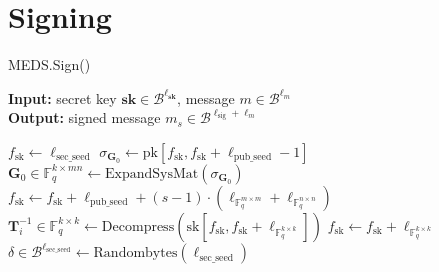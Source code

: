 \section{Signing}
\begin{algorithm}[H]
\caption{MEDS.Sign()}\label{alg:medssign}
\hspace*{\algorithmicindent} \textbf{Input:} secret key $\textbf{sk} \in \mathcal{B}^{\ell_\textbf{sk}}$, message $m \in \mathcal{B}^{\ell_m}$\\
\hspace*{\algorithmicindent} \textbf{Output:} signed message $m_s \in \mathcal{B}^{\ell_\text{sig} + \ell_m}$
\begin{algorithmic}[1]
\State $f_\text{sk} \gets \ell_\text{sec\_seed}$
\State $\sigma_{\textbf{G}_0} \gets \text{pk}[f_\text{sk}, f_\text{sk} + \ell_\text{pub\_seed} - 1]$
\State $\textbf{G}_0 \in \mathds{F}_q^{k \times mn} \gets \text{ExpandSysMat}(\sigma_{\textbf{G}_0})$
\State $f_\text{sk} \gets f_\text{sk} + \ell_\text{pub\_seed} + (s - 1) \cdot (\ell_{\mathds{F}_q^{m \times m}} + \ell_{\mathds{F}_q^{n \times n}})$
    \State $\textbf{T}_i^{-1} \in \mathds{F}_q^{k \times k} \gets \text{Decompress}(\text{sk}[f_\text{sk}, f_\text{sk} + \ell_{\mathds{F}_q^{k \times k}}])$
    \State $f_\text{sk} \gets f_\text{sk} + \ell_{\mathds{F}_q^{k \times k}}$
\EndFor
\State $\delta \in \mathcal{B}^{\ell_\text{sec\_seed}} \gets \text{Randombytes}(\ell_\text{sec\_seed})$

\end{algorithmic}
\end{algorithm}
